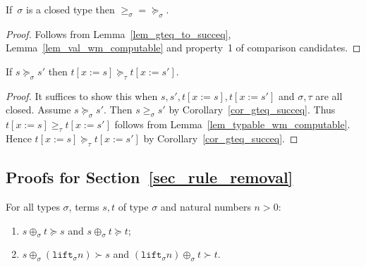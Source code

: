 \documentclass[a4paper,UKenglish,cleveref,autoref,numberwithinsect]{lipics-v2019}
\theoremstyle{definition}
\newcommand{\subst}[2]{#1:=#2}
\newcommand{\lift}{\mathtt{lift}}
\begin{document}
\begin{corollary}\label{cor_gteq_succeq}
  If~$\sigma$ is a closed type then ${\geq_{\sigma}} =
  {\succeq_\sigma}$.
\end{corollary}

\begin{proof}
  Follows from Lemma~\ref{lem_gteq_to_succeq},
  Lemma~\ref{lem_val_wm_computable} and property~1 of comparison
  candidates.
\end{proof}

{ \renewcommand{\thelemma}{\ref{lem_succeq_subst}}
\begin{lemma}
  If $s \succeq_\sigma s'$ then $t[\subst{x}{s}] \succeq_\tau t[\subst{x}{s'}]$.
\end{lemma}
\addtocounter{theorem}{-1}}

\begin{proof}
  It suffices to show this when
  $s,s',t[\subst{x}{s}],t[\subst{x}{s'}]$ and $\sigma,\tau$ are all
  closed. Assume $s \succeq_\sigma s'$. Then $s \geq_{\sigma} s'$ by
  Corollary~\ref{cor_gteq_succeq}. Thus $t[\subst{x}{s}] \geq_{\tau}
  t[\subst{x}{s'}]$ follows from
  Lemma~\ref{lem_typable_wm_computable}. Hence $t[\subst{x}{s}]
  \succeq_\tau t[\subst{x}{s'}]$ by Corollary~\ref{cor_gteq_succeq}.
\end{proof}

\subsection{Proofs for Section~\ref{sec_rule_removal}}

{ \renewcommand{\thelemma}{\ref{lem:plusparts}}
\begin{lemma}
For all types $\sigma$, terms $s,t$ of type $\sigma$ and natural
numbers $n > 0$:
\begin{enumerate}
\item $s \oplus_{\sigma} t \succeq s$ and $s \oplus_{\sigma} t \succeq
  t$;
\item $s \oplus_{\sigma} (\lift_{\sigma} n) \succ s$ and
  $(\lift_{\sigma} n) \oplus_{\sigma} t \succ t$.
\end{enumerate}
\end{lemma}
\addtocounter{theorem}{-1}}
\end{document}
